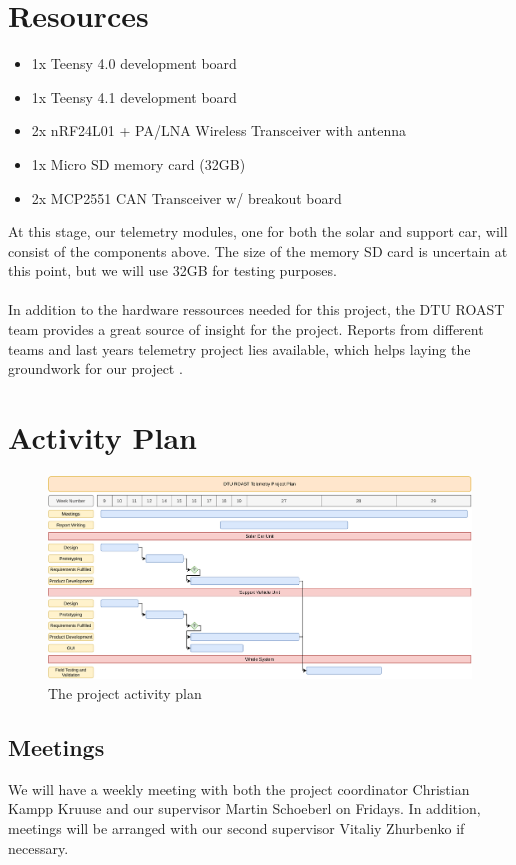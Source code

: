 \documentclass[]{article}
\begin{document}
\section{Resources}
\begin{itemize}
    \item 1x Teensy 4.0 development board
    \item 1x Teensy 4.1 development board
    \item 2x nRF24L01 + PA/LNA Wireless Transceiver with antenna
    \item 1x Micro SD memory card (32GB)
    \item 2x MCP2551 CAN Transceiver w/ breakout board
\end{itemize}
At this stage, our telemetry modules, one for both the solar and support car, will consist of the components above. The size of the memory SD card is uncertain at this point, but we will use 32GB for testing purposes.\\
\\
In addition to the hardware ressources needed for this project, the DTU ROAST team provides a great source of insight for the project. Reports from different teams and last years telemetry project lies available, which helps laying the groundwork for our project \cite{ROAST}.

\section{Activity Plan}
\begin{figure}[H]
    \centering
    \includegraphics[width=\textwidth]{documentation/images/projectPlan.pdf}
    \caption{The project activity plan}
    \label{fig:my_label}
\end{figure}
\subsection*{Meetings}
We will have a weekly meeting with both the project coordinator Christian Kampp Kruuse and our supervisor Martin Schoeberl on Fridays. In addition, meetings will be arranged with our second supervisor Vitaliy Zhurbenko if necessary. 
\end{document}
